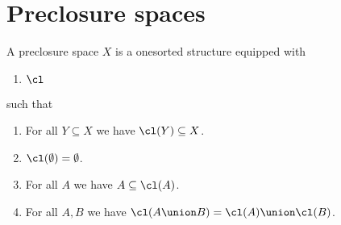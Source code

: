 

\section{Preclosure spaces}


\begin{struct}
    A preclosure space $X$ is a onesorted structure equipped with
    \begin{enumerate}
        \item $\cl$
    \end{enumerate}
    such that
    \begin{enumerate}
        \item For all $Y\subseteq X$ we have $\cl(Y)\subseteq X$.
        \item $\cl(\emptyset) = \emptyset$.
        \item For all $A$ we have $A\subseteq \cl(A)$.
        \item For all $A, B$ we have $\cl(A\union B) = \cl(A) \union \cl(B)$.
    \end{enumerate}
\end{struct}
